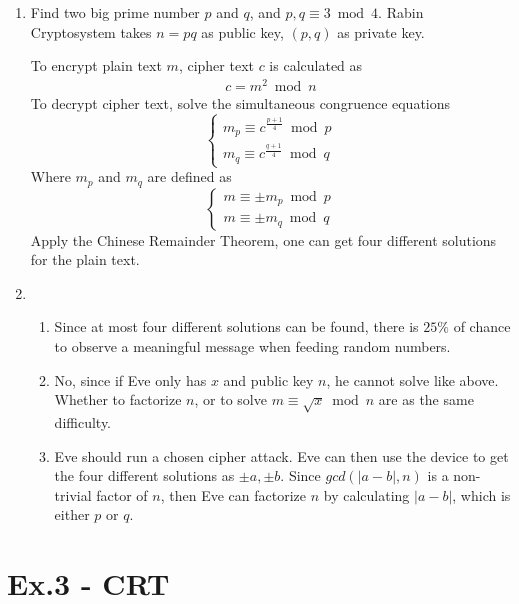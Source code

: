 \documentclass[12pt]{article}
\begin{document}
\begin{enumerate}
	\item Find two big prime number $p$ and $q$, and $p, q \equiv 3 \bmod 4$. Rabin Cryptosystem takes $n = pq$ as public key, $(p, q)$ as private key. 

	To encrypt plain text $m$, cipher text $c$ is calculated as 
	\begin{align*}
		c = m^2 \bmod n
	\end{align*}
	To decrypt cipher text, solve the simultaneous congruence equations
	\begin{displaymath}
		\left\{
		\begin{array}{l}
			m_p \equiv c^{\frac{p + 1}{4}} \bmod p\\
			m_q \equiv c^{\frac{q + 1}{4}} \bmod q
		\end{array}
		\right.
	\end{displaymath}
	Where $m_p$ and $m_q$ are defined as
	\begin{displaymath}
		\left\{
		\begin{array}{l}
			m \equiv \pm m_p \bmod p\\
			m \equiv \pm m_q \bmod q
		\end{array}
		\right.
	\end{displaymath}
	Apply the Chinese Remainder Theorem, one can get four different solutions for the plain text.
	\item 
	\begin{enumerate}
		\item Since at most four different solutions can be found, there is $25\%$ of chance to observe a meaningful message when feeding random numbers.
		\item No, since if Eve only has $x$ and public key $n$, he cannot solve like above. Whether to factorize $n$, or to solve $m \equiv \sqrt{x} \bmod n$ are as the same difficulty.
		\item Eve should run a chosen cipher attack. Eve can then use the device to get the four different solutions as $\pm a, \pm b$. Since $gcd(|a - b|, n)$ is a non-trivial factor of $n$, then Eve can factorize $n$ by calculating $|a - b|$, which is either $p$ or $q$.
	\end{enumerate}
\end{enumerate}

\section*{Ex.3 - CRT}
\end{document}
